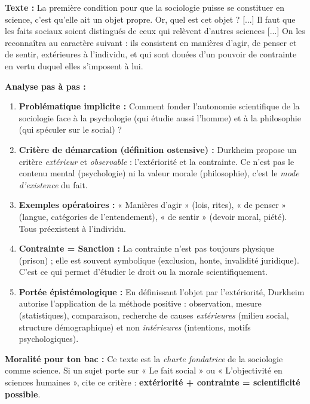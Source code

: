 \documentclass[11pt]{article}
\begin{document}
\begin{experience}
\textbf{Texte :} \guillemotleft La première condition pour que la sociologie puisse se constituer en science, c'est qu'elle ait un objet propre. Or, quel est cet objet ? [...] Il faut que les faits sociaux soient distingués de ceux qui relèvent d'autres sciences [...] On les reconnaîtra au caractère suivant : ils consistent en manières d'agir, de penser et de sentir, extérieures à l'individu, et qui sont douées d'un pouvoir de contrainte en vertu duquel elles s'imposent à lui. \guillemotright

\textbf{Analyse pas à pas :}
\begin{enumerate}
    \item \textbf{Problématique implicite :} Comment fonder l'autonomie scientifique de la sociologie face à la psychologie (qui étudie aussi l'homme) et à la philosophie (qui spéculer sur le social) ?
    \item \textbf{Critère de démarcation (définition ostensive) :} Durkheim propose un critère \emph{extérieur} et \emph{observable} : l'extériorité et la contrainte. Ce n'est pas le contenu mental (psychologie) ni la valeur morale (philosophie), c'est le \emph{mode d'existence} du fait.
    \item \textbf{Exemples opératoires :} « Manières d'agir » (lois, rites), « de penser » (langue, catégories de l'entendement), « de sentir » (devoir moral, piété). Tous préexistent à l'individu.
    \item \textbf{Contrainte = Sanction :} La contrainte n'est pas toujours physique (prison) ; elle est souvent symbolique (exclusion, honte, invalidité juridique). C'est ce qui permet d'étudier le droit ou la morale scientifiquement.
    \item \textbf{Portée épistémologique :} En définissant l'objet par l'extériorité, Durkheim autorise l'application de la méthode positive : observation, mesure (statistiques), comparaison, recherche de causes \emph{extérieures} (milieu social, structure démographique) et non \emph{intérieures} (intentions, motifs psychologiques).
\end{enumerate}
\textbf{Moralité pour ton bac :} Ce texte est la \emph{charte fondatrice} de la sociologie comme science. Si un sujet porte sur « Le fait social » ou « L'objectivité en sciences humaines », cite ce critère : \textbf{extériorité + contrainte = scientificité possible}.
\end{experience}
\end{document}
